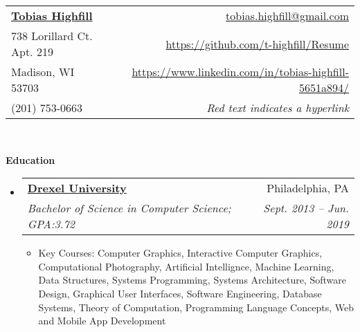 \documentclass[letterpaper,11pt]{article}
\makeatletter
\newcommand{\resitem}[1]{\item #1 \vspace{-2pt}}
\newcommand{\resheading}[1]{{\large \colorbox{mygrey}{\begin{minipage}{\textwidth}{\textbf{#1 \vphantom{p\^{E}}}}\end{minipage}}}}
\newcommand{\ressubheading}[4]{
\begin{tabular*}{6.5in}{l@{\extracolsep{\fill}}r}
		\textbf{#1} & #2 \\
		\textit{#3} & \textit{#4} \\
\end{tabular*}\vspace{-6pt}}
\newcommand{\myemail}{tobias.highfill@gmail.com}
\newcommand{\mywebsite}{https://github.com/t-highfill/Resume}
\newcommand{\linkedin}{https://www.linkedin.com/in/tobias-highfill-5651a894/}
\newcommand{\smallsect}[1]{{\footnotesize #1}}
\makeatother
\begin{document}
\newcommand{\myheader}{
\begin{tabular*}{7in}{l@{\extracolsep{\fill}}r}
	\textbf{\href{\mywebsite}{\LARGE Tobias Highfill}} & \href{mailto:\myemail}{\myemail}\\
	738 Lorillard Ct. Apt. 219 & \href{\mywebsite}{\mywebsite} \\
	Madison, WI 53703 & \href{\linkedin}{\linkedin} \\
	(201) 753-0663 & \smallsect{\textit{Red text indicates a hyperlink}} \\
	\end{tabular*}
\\
\vspace{0.1in}}

\myheader

\resheading{Education}
\begin{itemize}
	\item \ressubheading{\href{https://drexel.edu/}{Drexel University}}{Philadelphia, PA}{Bachelor of Science in Computer Science; GPA:3.72}{Sept. 2013 -- Jun. 2019}
		\smallsect{
		\begin{itemize}
			\resitem{Key Courses: Computer Graphics, Interactive Computer Graphics, Computational Photography, Artificial Intellignce, Machine Learning, Data Structures, Systems Programming, Systems Architecture, Software Design, Graphical User Interfaces, Software Engineering, Database Systems, Theory of Computation, Programming Language Concepts, Web and Mobile App Development}
		\end{itemize}
		}
\end{itemize}
\end{document}
